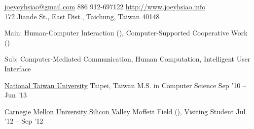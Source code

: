 \documentclass[10pt, a4paper]{article} %
\begin{document}
 



\noindent\href{mailto:joeycyhsiao@gmail.com}{joeycyhsiao@gmail.com}\bull %
\textsmaller{+}886 912-697122\bull %
\href{http://www.joeyhsiao.info}{http://www.joeyhsiao.info}\\ %
172 Jiande St., East Dist., Taichung, Taiwan 40148 

\spacedhrule{1.5em}{-1em} %



Main: Human-Computer Interaction (), Computer-Supported Cooperative Work ()

Sub: Computer-Mediated Communication, Human Computation, Intelligent User Interface

\spacedhrule{1.5em}{-1em} %



\headedsection %
{\href{http://www.ntu.edu.tw}{National Taiwan University}}
{Taipei, Taiwan}
{\headedsubsection %
	{M.S. in Computer Science}
	{Sep '10 -- Jun '13}
	{}
}

\headedsection %
{\href{http://www.cmu.edu/silicon-valley/}{Carnegie Mellon University Silicon Valley}}
{Moffett Field (), }
{\headedsubsection %
	{Visiting Student}
	{Jul '12 -- Sep '12} 
	{}
}
\end{document}
